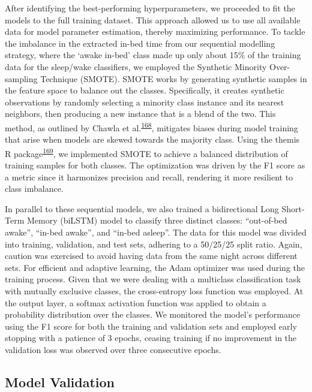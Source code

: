 \documentclass[
  10pt,
]{scrbook}
\begin{document}
After identifying the best-performing hyperparameters, we proceeded to
fit the models to the full training dataset. This approach allowed us to
use all available data for model parameter estimation, thereby
maximizing performance. To tackle the imbalance in the extracted in-bed
time from our sequential modelling strategy, where the `awake in-bed'
class made up only about 15\% of the training data for the sleep/wake
classifiers, we employed the Synthetic Minority Over-sampling Technique
(SMOTE). SMOTE works by generating synthetic samples in the feature
space to balance out the classes. Specifically, it creates synthetic
observations by randomly selecting a minority class instance and its
nearest neighbors, then producing a new instance that is a blend of the
two. This method, as outlined by Chawla et
al.\textsuperscript{\protect\hyperlink{ref-chawla_smote_2002}{168}},
mitigates biases during model training that arise when models are skewed
towards the majority class. Using the themis R
package\textsuperscript{\protect\hyperlink{ref-themis}{169}}, we
implemented SMOTE to achieve a balanced distribution of training samples
for both classes. The optimization was driven by the F1 score as a
metric since it harmonizes precision and recall, rendering it more
resilient to class imbalance.

In parallel to these sequential models, we also trained a bidirectional
Long Short-Term Memory (biLSTM) model to classify three distinct
classes: ``out-of-bed awake'', ``in-bed awake'', and ``in-bed asleep''.
The data for this model was divided into training, validation, and test
sets, adhering to a 50/25/25 split ratio. Again, caution was exercised
to avoid having data from the same night across different sets. For
efficient and adaptive learning, the Adam optimizer was used during the
training process. Given that we were dealing with a multiclass
classification task with mutually exclusive classes, the cross-entropy
loss function was employed. At the output layer, a softmax activation
function was applied to obtain a probability distribution over the
classes. We monitored the model's performance using the F1 score for
both the training and validation sets and employed early stopping with a
patience of 3 epochs, ceasing training if no improvement in the
validation loss was observed over three consecutive epochs.

\hypertarget{model-validation}{%
\subsection{Model Validation}\label{model-validation}}
\end{document}
